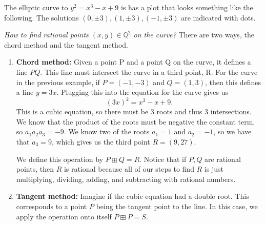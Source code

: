 \begin{example}
    The elliptic curve to $y^2 = x^3 - x + 9$ is has a plot that looks something like the following. The solutions $(0, \pm 3), (1, \pm 3), (-1, \pm 3)$ are indicated with dots.

    \begin{center}
    \footnotesize
    \def\svgwidth{0.35\linewidth}
    
    \end{center}
\end{example}

\textit{How to find rational points $(x,y) \in \mathbb{Q}^2$ on the curve?} There are two ways, the chord method and the tangent method.
\begin{enumerate}
    \item \textbf{Chord method:} Given a point P and a point Q on the curve, it defines a line $PQ$. This line must intersect the curve in a third point, R. For the curve in the previous example, if $P=(-1, -3)$ and $Q=(1, 3)$, then this defines a line $y=3x$. Plugging this into the equation for the curve gives us
    $$(3x)^2 = x^3 - x + 9.$$
    This is a cubic equation, so there must be 3 roots and thus 3 intersections. We know that the product of the roots must be negative the constant term, so $a_1 a_2 a_3 = -9$. We know two of the roots $a_1 = 1$ and $a_2 = -1$, so we have that $a_3 = 9$, which gives us the third point $R = (9, 27)$.

    We define this operation by $P \boxplus Q = R$. Notice that if $P, Q$ are rational points, then $R$ is rational because all of our steps to find $R$ is just multiplying, dividing, adding, and subtracting with rational numbers.

    \begin{center}
        \def\svgwidth{0.35\linewidth}
        
    \end{center}

    \pagebreak
    \item \textbf{Tangent method:} Imagine if the cubic equation had a double root. This corresponds to a point $P$ being the tangent point to the line. In this case, we apply the operation onto itself $P \boxplus P = S$.

    \begin{center}
        \def\svgwidth{0.35\linewidth}
        
    \end{center}
\end{enumerate}

